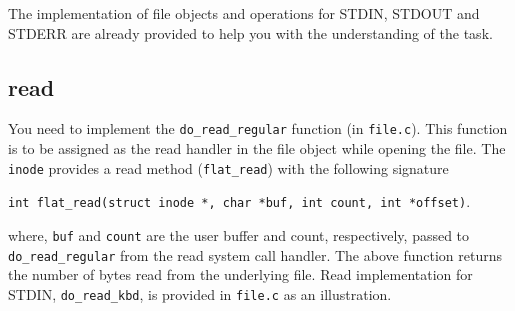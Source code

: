 \documentclass[12pt]{article}
\begin{document}
 
The implementation of file objects and operations for STDIN, STDOUT and STDERR are 
already provided to help you with the understanding of the task.



 
 

\subsection{read}

You need to implement the {\tt do\_read\_regular} function (in {\tt file.c}). This function is to be assigned as the read handler 
in the file object while opening the file. The {\tt inode} provides a read method ({\tt flat\_read}) with the following signature


\vspace{0.25cm}
\noindent
{\tt int flat\_read(struct inode *, char *buf, int count, int *offset)}. 
\vspace{0.25cm}

\noindent
where, {\tt buf} and {\tt count} are the user buffer and count, respectively, 
passed to {\tt do\_read\_regular} from the read system call handler.
%
The above function returns the number of bytes read from the underlying file.
%
Read implementation for STDIN, {\tt do\_read\_kbd}, is provided in {\tt file.c} as an illustration.
\end{document}

